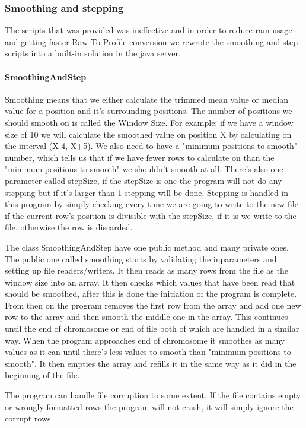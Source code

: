 \subsubsection{Smoothing and stepping}
The scripts that was provided was ineffective and in order to reduce ram usage and getting faster Raw-To-Profile conversion we rewrote the smoothing and step scripts into a built-in solution in the java server.

\paragraph{SmoothingAndStep}
Smoothing means that we either calculate the trimmed mean value or median value for a position and it's surrounding positions. The number of positions we should smooth on is called the Window Size. For example: if we have a window size of 10 we will calculate the smoothed value on position X by calculating on the interval (X-4, X+5). We also need to have a "minimum positions to smooth" number, which tells us that if we have fewer rows to calculate on than the "minimum positions to smooth" we shouldn't smooth at all. There's also one parameter called stepSize, if the stepSize is one the program will not do any stepping but if it's larger than 1 stepping will be done. Stepping is handled in this program by simply checking every time we are going to write to the new file if the current row's position is divisible with the stepSize, if it is we write to the file, otherwise the row is discarded.

The class SmoothingAndStep have one public method and many private ones. The public one called smoothing starts by validating the inparameters and setting up file readers/writers. It then reads as many rows from the file as the window size into an array. It then checks which values that have been read that should be smoothed, after this is done the initiation of the program is complete. From then on the program removes the first row from the array and add one new row to the array and then smooth the middle one in the array. This continues until the end of chromosome or end of file both of which are handled in a similar way. When the program approaches end of chromosome it smoothes as many values as it can until there's less values to smooth than "minimum positions to smooth". It then empties the array and refills it in the same way as it did in the beginning of the file.

The program can handle file corruption to some extent. If the file contains empty or wrongly formatted rows the program will not crash, it will simply ignore the corrupt rows.

